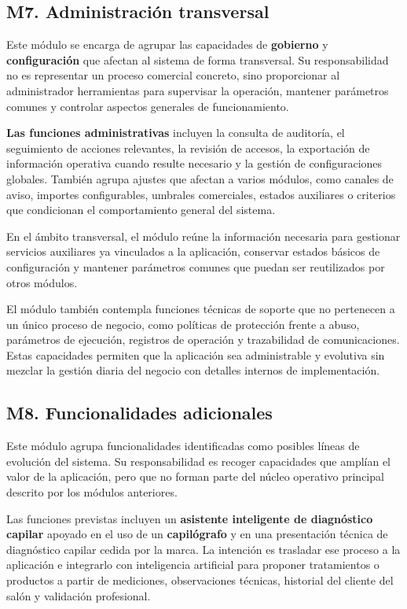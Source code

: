 \subsection{M7. Administración transversal}

Este módulo se encarga de agrupar las capacidades de \textbf{gobierno} y \textbf{configuración} que afectan al sistema de forma transversal. Su responsabilidad no es representar un proceso comercial concreto, sino proporcionar al administrador herramientas para supervisar la operación, mantener parámetros comunes y controlar aspectos generales de funcionamiento.

\textbf{Las funciones administrativas} incluyen la consulta de auditoría, el seguimiento de acciones relevantes, la revisión de accesos, la exportación de información operativa cuando resulte necesario y la gestión de configuraciones globales. También agrupa ajustes que afectan a varios módulos, como canales de aviso, importes configurables, umbrales comerciales, estados auxiliares o criterios que condicionan el comportamiento general del sistema.

En el ámbito transversal, el módulo reúne la información necesaria para gestionar servicios auxiliares ya vinculados a la aplicación, conservar estados básicos de configuración y mantener parámetros comunes que puedan ser reutilizados por otros módulos.

El módulo también contempla funciones técnicas de soporte que no pertenecen a un único proceso de negocio, como políticas de protección frente a abuso, parámetros de ejecución, registros de operación y trazabilidad de comunicaciones. Estas capacidades permiten que la aplicación sea administrable y evolutiva sin mezclar la gestión diaria del negocio con detalles internos de implementación.

\subsection{M8. Funcionalidades adicionales}

Este módulo agrupa funcionalidades identificadas como posibles líneas de evolución del sistema. Su responsabilidad es recoger capacidades que amplían el valor de la aplicación, pero que no forman parte del núcleo operativo principal descrito por los módulos anteriores.

Las funciones previstas incluyen un \textbf{asistente inteligente de diagnóstico capilar} apoyado en el uso de un \textbf{capilógrafo} y en una presentación técnica de diagnóstico capilar cedida por la marca. La intención es trasladar ese proceso a la aplicación e integrarlo con inteligencia artificial para proponer tratamientos o productos a partir de mediciones, observaciones técnicas, historial del cliente del salón y validación profesional.

